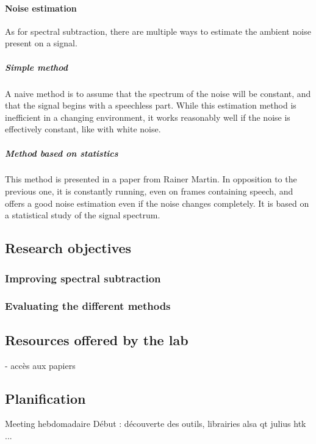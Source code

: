\paragraph{Noise estimation}
As for spectral subtraction, there are multiple ways to estimate the ambient noise present on a signal.
\subparagraph{Simple method}
A naive method is to assume that the spectrum of the noise will be constant, and that the signal begins with a speechless part. While this estimation method is inefficient in a changing environment, it works reasonably well if the noise is effectively constant, like with white noise.
\subparagraph{Method based on statistics}
This method is presented in a paper from Rainer Martin\cite{martin2001noise}. In opposition to the previous one, it is constantly running, even on frames containing speech, and offers a good noise estimation even if the noise changes completely. It is based on a statistical study of the signal spectrum.
\subsection{Research objectives}
\subsubsection{Improving spectral subtraction}
\subsubsection{Evaluating the different methods}
\subsection{Resources offered by the lab}
- accès aux papiers
\subsection{Planification}
Meeting hebdomadaire
Début : découverte des outils, librairies
alsa
qt
julius
htk
...